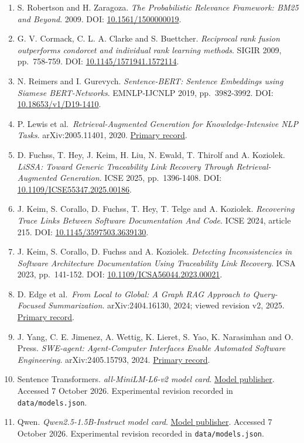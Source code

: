 \documentclass[
  11pt,
  a4paper,
]{report}
\begin{document}
\begin{enumerate}
\def\labelenumi{\arabic{enumi}.}
\item
  S. Robertson and H. Zaragoza. \emph{The Probabilistic Relevance
  Framework: BM25 and Beyond}. 2009. DOI:
  \href{https://doi.org/10.1561/1500000019}{10.1561/1500000019}.
\item
  G. V. Cormack, C. L. A. Clarke and S. Buettcher. \emph{Reciprocal rank
  fusion outperforms condorcet and individual rank learning methods}.
  SIGIR 2009, pp.~758-759. DOI:
  \href{https://doi.org/10.1145/1571941.1572114}{10.1145/1571941.1572114}.
\item
  N. Reimers and I. Gurevych. \emph{Sentence-BERT: Sentence Embeddings
  using Siamese BERT-Networks}. EMNLP-IJCNLP 2019, pp.~3982-3992. DOI:
  \href{https://aclanthology.org/D19-1410/}{10.18653/v1/D19-1410}.
\item
  P. Lewis et al.~\emph{Retrieval-Augmented Generation for
  Knowledge-Intensive NLP Tasks}. arXiv:2005.11401, 2020.
  \href{https://arxiv.org/abs/2005.11401}{Primary record}.
\item
  D. Fuchss, T. Hey, J. Keim, H. Liu, N. Ewald, T. Thirolf and A.
  Koziolek. \emph{LiSSA: Toward Generic Traceability Link Recovery
  Through Retrieval-Augmented Generation}. ICSE 2025, pp.~1396-1408.
  DOI: \href{https://ardoco.de/c/icse25}{10.1109/ICSE55347.2025.00186}.
\item
  J. Keim, S. Corallo, D. Fuchss, T. Hey, T. Telge and A. Koziolek.
  \emph{Recovering Trace Links Between Software Documentation And Code}.
  ICSE 2024, article 215. DOI:
  \href{https://ardoco.de/c/icse24}{10.1145/3597503.3639130}.
\item
  J. Keim, S. Corallo, D. Fuchss and A. Koziolek. \emph{Detecting
  Inconsistencies in Software Architecture Documentation Using
  Traceability Link Recovery}. ICSA 2023, pp.~141-152. DOI:
  \href{https://ardoco.de/c/icsa23}{10.1109/ICSA56044.2023.00021}.
\item
  D. Edge et al.~\emph{From Local to Global: A Graph RAG Approach to
  Query-Focused Summarization}. arXiv:2404.16130, 2024; viewed revision
  v2, 2025. \href{https://arxiv.org/abs/2404.16130}{Primary record}.
\item
  J. Yang, C. E. Jimenez, A. Wettig, K. Lieret, S. Yao, K. Narasimhan
  and O. Press. \emph{SWE-agent: Agent-Computer Interfaces Enable
  Automated Software Engineering}. arXiv:2405.15793, 2024.
  \href{https://arxiv.org/abs/2405.15793}{Primary record}.
\item
  Sentence Transformers. \emph{all-MiniLM-L6-v2 model card}.
  \href{https://huggingface.co/sentence-transformers/all-MiniLM-L6-v2}{Model
  publisher}. Accessed 7 October 2026. Experimental revision recorded in
  \texttt{data/models.json}.
\item
  Qwen. \emph{Qwen2.5-1.5B-Instruct model card}.
  \href{https://huggingface.co/Qwen/Qwen2.5-1.5B-Instruct}{Model
  publisher}. Accessed 7 October 2026. Experimental revision recorded in
  \texttt{data/models.json}.
\end{enumerate}
\end{document}
